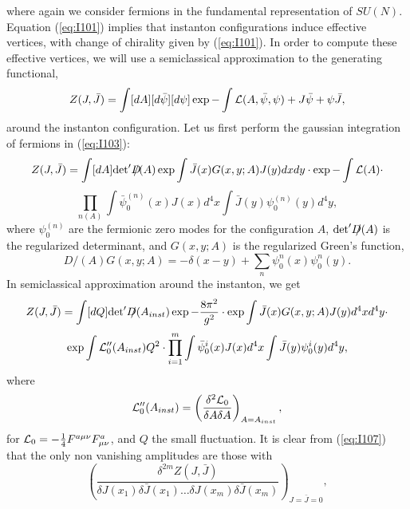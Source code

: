 where again we consider fermions in the fundamental
representation of $SU(N)$. Equation (\ref{eq:I101}) implies that
instanton configurations induce effective vertices, with change
of chirality given by (\ref{eq:I101}). In order to compute these
effective vertices, we will use a semiclassical approximation to
the generating functional,
\begin{equation}
Z(J,\bar{J}) = \int [dA] [d\bar{\psi}][d\psi] \exp - \int {\cal L}(A,\bar{\psi},\psi)+ 
J\bar{\psi}+\psi\bar{J},
\label{eq:I103}
\end{equation}
around the instanton configuration. Let us first perform the
gaussian integration of fermions in (\ref{eq:I103}):
\[
Z(J,\bar{J}) = \int [dA] \hbox {det}' D \! \! \! \! / (A) \exp \int
\bar{J}(x) G(x,y;A) J(y) dx dy \cdot \exp - \int {\cal L}(A) \cdot
\]
\begin{equation}
\prod_{n(A)} \int \bar{\psi}_0^{(n)}(x) J(x) d^4x \int
\bar{J}(y)\psi_0^{(n)}(y) d^4y,
\label{eq:I104}
\end{equation}
where $\psi_0^{(n)}$ are the fermionic zero modes for the
configuration $A$, $\hbox {det}' D \! \! \! /(A)$ is the
regularized determinant, and $G(x,y;A)$ is the regularized Green's 
function,
\begin{equation}
D \! \! \! \! /(A)G(x,y;A) = - \delta(x-y) + \sum_n \psi_0^{n}(x) \psi_0^{n}(y).
\label{eq:I105}
\end{equation}
In semiclassical approximation around the instanton, we get
\[
Z(J,\bar{J}) = \int [dQ] \hbox {det}' D \! \! \! /(A_{inst}) \exp - \frac 
{8 \pi^2}{g^2} \cdot \exp \int \bar{J}(x) G(x,y;A) J(y) d^4x d^4y \cdot 
\]
\begin{equation}
\exp \int {\cal L}_0''(A_{inst}) Q^2 \cdot \prod_{i=1}^{m} \int \bar{\psi}_0^{i}
(x) J(x) d^4 x \int \bar{J}(y)\psi_0^{i}(y) d^4y,
\label{eq:I106}
\end{equation}
where 
\begin{equation}
{\cal L}_0''(A_{inst}) = \left( \frac {\delta^2 {\cal L}_0}{\delta A \delta A} \right)_{A=
A_{inst}},
\label{eq:I107}
\end{equation}
for ${\cal L}_0 = - \frac {1}{4} F^{a \mu \nu} F_{\mu \nu}^{a}$,
and $Q$ the small fluctuation. It is clear from (\ref{eq:I107})
that the only non vanishing amplitudes are those with
\begin{equation}
\left( \frac {\delta^{2m} Z(J,\bar{J})}{\delta J(x_1) \delta \bar{J}(x_1) \ldots 
\delta J(x_m) \delta \bar{J}(x_m)} \right)_{J=\bar{J}=0},
\label{eq:I108}
\end{equation}
